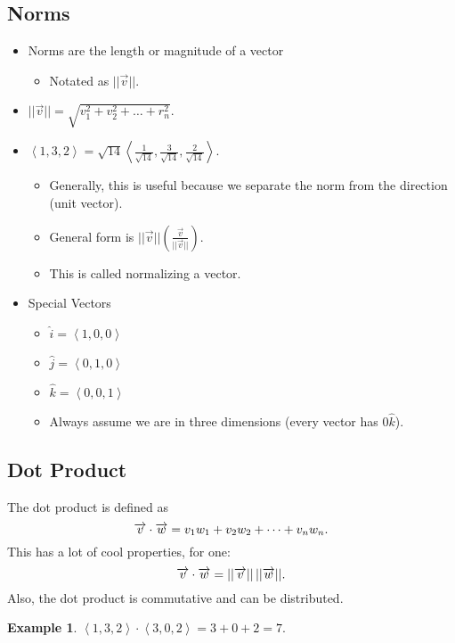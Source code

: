 \documentclass[12pt]{article}
\theoremstyle{plain} %
\theoremstyle{definition}
\theoremstyle{definition}
\theoremstyle{definition}
\newtheorem{exmp}{Example}[section]
\theoremstyle{remark}
\newcommand{\angled}[1]{\left\langle {#1} \right\rangle}
\newcommand*{\vv}[1]{\overrightarrow{\mkern0mu#1}}
\begin{document}
\subsection{Norms}
\begin{itemize}
    \item Norms are the length or magnitude of a vector
    \begin{itemize}
        \item Notated as $||\overrightarrow{v}||$.
    \end{itemize}
    \item $|| \overrightarrow{v} || = \sqrt{v_1^2 + v_2^2 + \dots + r_n^2}$.
    \item $\angled{1,3,2} = \sqrt{14} \angled{\frac{1}{\sqrt{14}},\frac{3}{\sqrt{14}},\frac{2}{\sqrt{14}}}$.
    \begin{itemize}
        \item Generally, this is useful because we separate the norm from the direction (unit vector).
        \item General form is $|| \vec{v} || (\frac{\vec{v}}{||\vec{v}||})$.
        \item This is called normalizing a vector.
    \end{itemize}
    \item Special Vectors
    \begin{itemize}
        \item $\hat{i} = \angled{1,0,0}$
        \item $\hat{j} = \angled{0,1,0}$
        \item $\hat{k} = \angled{0,0,1}$
        \item Always assume we are in three dimensions (every vector has $0\hat{k}$).
    \end{itemize}
\end{itemize}

\subsection{Dot Product}
The dot product is defined as
\[ \vv{v} \cdot \vv{w} = v_1w_1 + v_2w_2 + \dots + v_nw_n. \]
This has a lot of cool properties, for one: \[\vv{v} \cdot \vv{w} = ||\vv{v}||\,||\vv{w}||.\]
Also, the dot product is commutative and can be distributed.
\begin{exmp}
    $\angled{1,3,2} \cdot \angled{3,0,2} = 3+0+2 = 7$.
\end{exmp}
\end{document}

